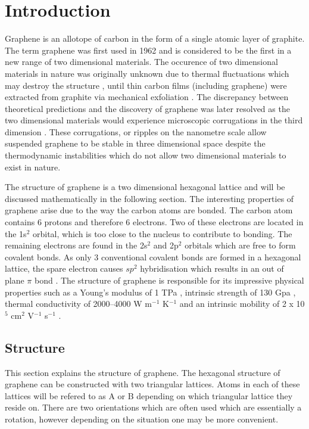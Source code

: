 %
\chapter{Introduction}
\label{Introduction}
	Graphene is an allotope of carbon in the form of a single atomic layer of graphite. The term graphene was first used in 1962 \cite{b68} and is considered to be the first in a new range of two dimensional materials. The occurence of two dimensional materials in nature was originally unknown due to thermal fluctuations which may destroy the structure \cite{b64, b69}, until thin carbon films (including graphene) were extracted from graphite via mechanical exfoliation \cite{b65, b70}. The discrepancy between theoretical predictions and the discovery of graphene was later resolved as the two dimensional materials would experience microscopic corrugations in the third dimension \cite{b66, b67}. These corrugations, or ripples on the nanometre scale allow suspended graphene to be stable in three dimensional space despite the thermodynamic instabilities which do not allow two dimensional materials to exist in nature.

	The structure of graphene is a two dimensional hexagonal lattice \cite{b5} and will be discussed mathematically in the following section. The interesting properties of graphene arise due to the way the carbon atoms are bonded. The carbon atom contains 6 protons and therefore 6 electrons. Two of these electrons are located in the 1s$^2$ orbital, which is too close to the nucleus to contribute to bonding. The remaining electrons are found in the 2s$^2$ and 2p$^2$ orbitals which are free to form covalent bonds. As only 3 conventional covalent bonds are formed in a hexagonal lattice, the spare electron causes $sp^{2}$ hybridisation which results in an out of plane $\pi$ bond \cite{b46, b62}. The structure of graphene is responsible for its impressive physical properties such as a Young's modulus of 1 TPa \cite{b58, b63}, intrinsic strength of 130 Gpa \cite{b58}, thermal conductivity of 2000–4000 W m$^{-1}$ K$^{-1}$ \cite{b60} and an intrinsic mobility of 2 x 10$^{5}$ cm$^{2}$ V$^{-1}$ s$^{-1}$ \cite{b45, b61}. 
	\section{Structure}
	\label{Introduction - Structure}
		This section explains the structure of graphene. The hexagonal structure of graphene can be constructed with two triangular lattices. Atoms in each of these lattices will be refered to as A or B depending on which triangular lattice they reside on. There are two orientations which are often used which are essentially a rotation, however depending on the situation one may be more convenient.
